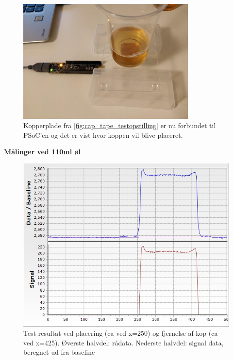 \documentclass[HardwareDesign/HardwareDesign_main.tex]{subfiles}
\begin{document}
\begin{figure}[H]
    \centering
    \includegraphics[width=0.8\textwidth]{HardwareDesign/CupSensor/graphics/CapTest/cap_testopstiling.jpg}
    \caption{Kopperplade fra \ref{fig:cap_tape_testopstilling} er nu forbundet til PSoC'en og det er vist hvor koppen vil blive placeret.}
    \label{fig:cap_testopstilling}
\end{figure}
\newpage
\textbf{Målinger ved 110ml øl}
\begin{figure}[H]
    \centering
    \includegraphics[width=\textwidth]{HardwareDesign/CupSensor/graphics/CapTest/placingAndRemovingCup1(beer).jpg}
    \caption{Test resultat ved placering (ca ved x=250) og fjernelse af kop (ca ved x=425). Øverste halvdel: rådata. Nederste halvdel: signal data, beregnet ud fra baseline}
    \label{fig:cap_test_place_and_remove_110}
\end{figure}
\end{document}
